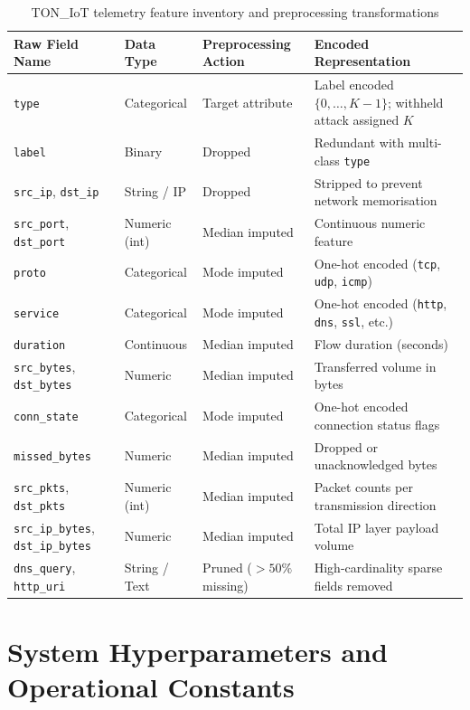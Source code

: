 \begin{table}[htpb]
\centering
\small
\renewcommand{\arraystretch}{1.3}
\caption{TON\_IoT telemetry feature inventory and preprocessing transformations}
\label{tab:feature_dictionary}
\begin{tabular}{|p{3.2cm}|p{2.2cm}|p{2.8cm}|p{4.6cm}|}
\hline
\textbf{Raw Field Name} & \textbf{Data Type} & \textbf{Preprocessing Action} & \textbf{Encoded Representation} \\ \hline
\texttt{type} & Categorical & Target attribute & Label encoded $\{0, \dots, K-1\}$; withheld attack assigned $K$ \\ \hline
\texttt{label} & Binary & Dropped & Redundant with multi-class \texttt{type} \\ \hline
\texttt{src\_ip}, \texttt{dst\_ip} & String / IP & Dropped & Stripped to prevent network memorisation \\ \hline
\texttt{src\_port}, \texttt{dst\_port} & Numeric (int) & Median imputed & Continuous numeric feature \\ \hline
\texttt{proto} & Categorical & Mode imputed & One-hot encoded (\texttt{tcp}, \texttt{udp}, \texttt{icmp}) \\ \hline
\texttt{service} & Categorical & Mode imputed & One-hot encoded (\texttt{http}, \texttt{dns}, \texttt{ssl}, etc.) \\ \hline
\texttt{duration} & Continuous & Median imputed & Flow duration (seconds) \\ \hline
\texttt{src\_bytes}, \texttt{dst\_bytes} & Numeric & Median imputed & Transferred volume in bytes \\ \hline
\texttt{conn\_state} & Categorical & Mode imputed & One-hot encoded connection status flags \\ \hline
\texttt{missed\_bytes} & Numeric & Median imputed & Dropped or unacknowledged bytes \\ \hline
\texttt{src\_pkts}, \texttt{dst\_pkts} & Numeric (int) & Median imputed & Packet counts per transmission direction \\ \hline
\texttt{src\_ip\_bytes}, \texttt{dst\_ip\_bytes} & Numeric & Median imputed & Total IP layer payload volume \\ \hline
\texttt{dns\_query}, \texttt{http\_uri} & String / Text & Pruned ($>50\%$ missing) & High-cardinality sparse fields removed \\ \hline
\end{tabular}
\end{table}

\section{System Hyperparameters and Operational Constants}
\label{app:hyperparams}

